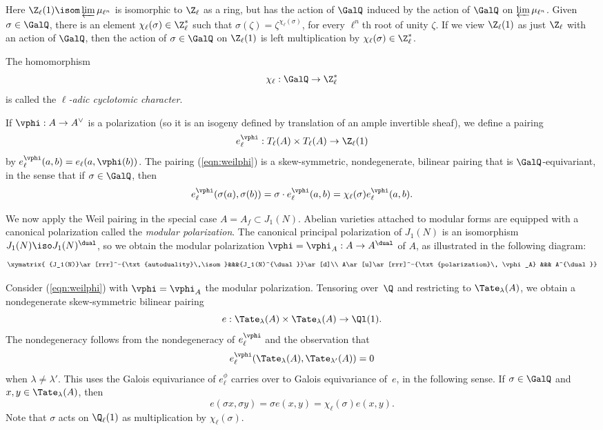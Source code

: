 \documentclass{report}
\begin{document}
Here $\Z_\ell(1) \isom \varprojlim \mu_{\ell^n}$ is isomorphic
to $\Z_\ell$ as a ring, but has the action of $\GalQ$ induced
by the action of $\GalQ$ on $\varprojlim \mu_{\ell^n}$.  Given
$\sigma\in\GalQ$, there is an element $\chi_\ell(\sigma)\in \Z_\ell^*$
such that $\sigma(\zeta) = \zeta^{\chi_\ell(\sigma)}$, for every
$\ell^n$th root of unity $\zeta$.  If we view $\Z_\ell(1)$ as
just $\Z_\ell$ with an action of $\GalQ$, then the action of
$\sigma\in\GalQ$ on $\Z_\ell(1)$ is left multiplication by
$\chi_\ell(\sigma)\in \Z_\ell^*$.
\begin{definition}
The homomorphism
\[
  \chi_\ell:\GalQ\to\Z_\ell^*
\]
is called the {\em $\ell$-adic cyclotomic character}.
\end{definition}

If $\vphi:A\to A^{\vee}$ is a polarization (so it is
an isogeny defined by translation of an ample
invertible sheaf), we define a pairing
\begin{equation}\label{eqn:weilphi}
   e^{\vphi}_\ell: T_{\ell}(A) \times T_{\ell}(A) \to \Z_\ell(1)
\end{equation}
by $e^{\vphi}_{\ell}(a,b) = e_{\ell}(a,\vphi(b))$.
The pairing (\ref{eqn:weilphi}) is a skew-symmetric, nondegenerate,
bilinear pairing that is $\GalQ$-equivariant, in the sense that
if $\sigma\in\GalQ$, then
\[
  e^{\vphi}_\ell(\sigma(a),\sigma(b)) =
  \sigma \cdot e^{\vphi}_\ell(a,b) =
   \chi_\ell(\sigma)e^{\vphi}_\ell(a,b).
\]


We now apply the Weil pairing in the special case
$A=A_f\subset J_1(N)$.  Abelian varieties attached to modular
forms are equipped with a canonical polarization called
the {\em modular polarization}.
The canonical principal polarization
of $J_1(N)$ is an isomorphism
$J_1(N)\iso J_1(N)^{\dual}$, so we obtain the modular polarization
$\vphi=\vphi_A:A\to A^{\dual}$ of $A$, as illustrated in the following
diagram:
\[
 \xymatrix{
{J_1(N)}\ar[rrr]^-{\txt{autoduality}\,\isom}&&&{J_1(N)^{\dual}}\ar[d]\\
   A\ar[u]\ar[rrr]^-{\txt{polarization}\, \vphi_A} &&& A^{\dual}}
\]

Consider (\ref{eqn:weilphi}) with $\vphi = \vphi_A$ the modular
polarization. Tensoring over~$\Q$ and
restricting to $\Tate_{\lambda}(A)$, we obtain
a nondegenerate skew-symmetric bilinear pairing
\begin{equation}\label{eqn:pairing_e}
  e: \Tate_{\lambda}(A)\times\Tate_{\lambda}(A)\to \Ql(1).
\end{equation}
The nondegeneracy follows from the nondegeneracy of
$e_{\ell}^{\vphi}$ and the observation that
$$e_\ell^{\vphi}(\Tate_{\lambda}(A),\Tate_{\lambda'}(A))=0$$ when
$\lambda\neq\lambda'$.  This uses the Galois equivariance of
$e_{\ell}^{\phi}$ carries over to Galois equivariance of~$e$, in
the following sense. If $\sigma\in\GalQ$ and
$x,y\in\Tate_{\lambda}(A)$, then
\[
  e(\sigma{}x,\sigma{}y) = \sigma e(x,y)=
\chi_{\ell}(\sigma)e(x,y).
\]
Note that $\sigma$ acts on $\Q_{\ell}(1)$ as multiplication by
$\chi_{\ell}(\sigma)$.
\end{document}
